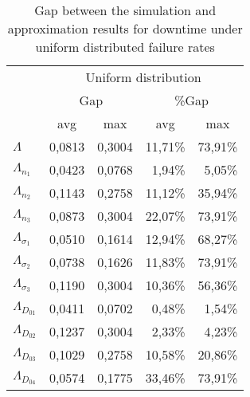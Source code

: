 \documentclass[preprint,12pt]{elsarticle}
\begin{document}
\begin{table}[htbp]
  \centering
  \caption{Gap between the simulation and approximation results for downtime under uniform distributed failure rates}
    \begin{tabular}{lrrrr}
    \toprule
          & \multicolumn{4}{c}{Uniform distribution} \\
          & \multicolumn{2}{c}{Gap} & \multicolumn{2}{c}{\%Gap} \\
          & \multicolumn{1}{c}{avg} & \multicolumn{1}{c}{max} & \multicolumn{1}{c}{avg} & \multicolumn{1}{c}{max} \\
   \midrule
    $\Lambda$ & 0,0813 & 0,3004 & 11,71\% & 73,91\% \\
    $\Lambda_{n_{1}}$ & 0,0423 & 0,0768 & 1,94\% & 5,05\% \\
    $\Lambda_{n_{2}}$ & 0,1143 & 0,2758 & 11,12\% & 35,94\% \\
    $\Lambda_{n_{3}}$ & 0,0873 & 0,3004 & 22,07\% & 73,91\% \\
    $\Lambda_{\sigma_{1}}$ & 0,0510 & 0,1614 & 12,94\% & 68,27\% \\
    $\Lambda_{\sigma_{2}}$ & 0,0738 & 0,1626 & 11,83\% & 73,91\% \\
    $\Lambda_{\sigma_{3}}$ & 0,1190 & 0,3004 & 10,36\% & 56,36\% \\
    $\Lambda_{D_{01}}$ & 0,0411 & 0,0702 & 0,48\% & 1,54\% \\
    $\Lambda_{D_{02}}$ & 0,1237 & 0,3004 & 2,33\% & 4,23\% \\
    $\Lambda_{D_{03}}$ & 0,1029 & 0,2758 & 10,58\% & 20,86\% \\
    $\Lambda_{D_{04}}$ & 0,0574 & 0,1775 & 33,46\% & 73,91\% \\
    \bottomrule
    \end{tabular}%
  \label{tab:uniformgab}%
\end{table}%
\end{document}
